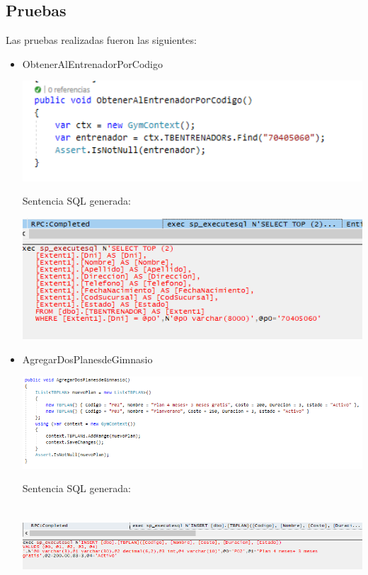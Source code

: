\subsection{Pruebas}
Las pruebas realizadas fueron las siguientes:
\begin{itemize}
	\item ObtenerAlEntrenadorPorCodigo 
\begin{center}
\includegraphics[width=15cm]{./Imagenes/prueba1.png}
\end{center}
Sentencia SQL generada:
\begin{center}
\includegraphics[width=15cm]{./Imagenes/profile1.png}
\end{center}
	\item AgregarDosPlanesdeGimnasio
\begin{center}
\includegraphics[width=17cm]{./Imagenes/prueba2.png}
\end{center}
Sentencia SQL generada:
\begin{center}
\includegraphics[width=17cm, height=3cm]{./Imagenes/profile2-1.png}

\end{center}
\end{itemize}
